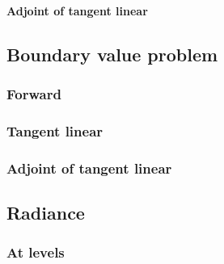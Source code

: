 %
\paragraph{Adjoint of tangent linear}
\label{sec:mem-layer_quantities-particular_solution-adjoint_of_tangent_linear}


%
\subsection{Boundary value problem}
\label{sec:mem-bvp}


\subsubsection{Forward}
\label{sec:mem-bvp-forward}


%
\subsubsection{Tangent linear}
\label{sec:mem-bvp-tangent_linear}


%
\subsubsection{Adjoint of tangent linear}
\label{sec:mem-bvp-adjoint_of_tangent_linear}


%
\subsection{Radiance}
\label{sec:mem-radiance}


\subsubsection{At levels}
\label{sec:mem-radiance_at_levels}


